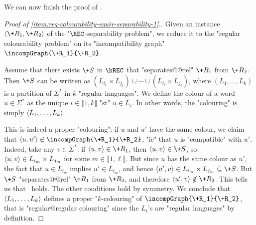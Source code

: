 We can now finish the proof of .

\begin{proof}[Proof of \eqref{item:reg-colourability-equiv-separability-1}.]
    \AP Given an instance $\tup{\+R_1,\+R_2}$ of the "$\REC$-separability problem", we
    reduce it to the "regular colourability problem" on its "incompatibility graph"
    $\incompGraph{\+R_1}{\+R_2}$.

    Assume that there exists $\+S$ in $\kREC$ that "separates@@rel" $\+R_1$ from $\+R_2$.
    Then $\+S$ can be written as $(L_{i_1}\times L_{j_1}) \cup \cdots \cup (L_{i_\ell}\times L_{j_\ell})$, 
    where $(L_1,\dotsc,L_k)$ is a partition of $\Sigma^*$ in $k$ "regular languages".
    We define the colour of a word $u \in \Sigma^*$ as the unique $i \in \lBrack 1,k \rBrack$
    "st" $u \in L_i$. In other words, the "colouring" is simply $\langle L_1,\dotsc,L_k\rangle$. 

    This is indeed a proper "colouring": if $u$ and $u'$ have the same colour,
    we claim that $\tup{u,u'} \not\in \incompGraph{\+R_1}{\+R_2}$, "ie" that
    $u$ is "compatible" with $u'$. Indeed, take any $v \in \Sigma^*$: if $\tup{u,v} \in \+R_1$,
    then $\tup{u,v} \in \+S$, so $\langle u,v\rangle \in L_{i_m}\times L_{j_m}$ for some $m \in \lBrack 1,\ell\rBrack$. But since $u$ has the same colour 
    as $u'$, the fact that $u \in L_{i_m}$ implies $u' \in L_{i_m}$, and hence 
    $\tup{u',v} \in L_{i_m}\times L_{j_m}\subseteq \+S$.
    But $\+S$ "separates@@rel" $\+R_1$ from $\+R_2$, and therefore $\tup{u',v} \not\in \+R_2$.
    This tells us that \compL\ holds. The other conditions hold by symmetry.
    We conclude that $\langle L_1,\dotsc,L_k\rangle$ defines
    a proper "$k$-colouring" of $\incompGraph{\+R_1}{\+R_2}$, that is "regular@regular colouring" since the $L_i$'s are "regular languages" by definition.


\end{proof}
